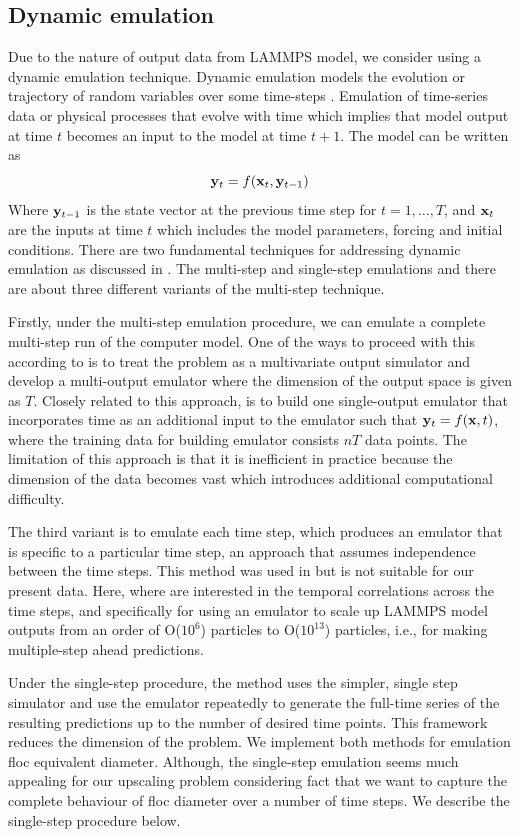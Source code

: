 \subsection{Dynamic emulation}
Due to the nature of output data from LAMMPS model, we consider using a dynamic emulation technique. Dynamic emulation models the evolution or trajectory of random variables over some time-steps \citep{pd12}. Emulation of time-series data or physical processes that evolve with time which implies that model output at time $t$ becomes an input to the model at time $t+1$. The model can be written as 
\begin{equation}\label{dyna3}
{\bf y}_t = f({\bf x}_t, {\bf y}_{t-1})
\end{equation}
Where ${\bf y}_{t-1}$ is the state vector at the previous time step for $t={1,\ldots,T}$, and ${\bf x}_t$ are the inputs at time $t$ which includes the model parameters, forcing and initial conditions. There are two fundamental techniques for addressing dynamic emulation as discussed in \citep{pd12}. The multi-step and single-step emulations and there are about three different variants of the multi-step technique.

Firstly, under the multi-step emulation procedure, we can emulate a complete multi-step run of the computer model. One of the ways to proceed with this according to \citet{pd14} is to treat the problem as a multivariate output simulator and develop a multi-output emulator where the dimension of the output space is given as $T$. Closely related to this approach, is to build one single-output emulator that incorporates time as an additional input to the emulator such that ${\bf y}_t = f({\bf x},t)$, where the training data for building emulator consists $nT$ data points. The limitation of this approach is that it is inefficient in practice because the dimension of the data becomes vast which introduces additional computational difficulty. 

The third variant is to emulate each time step, which produces an emulator that is specific to a particular time step, an approach that assumes independence between the time steps. This method was used in \citet{pd27} but is not suitable for our present data. Here, where are interested in the temporal correlations across the time steps, and specifically for using an emulator to scale up LAMMPS model outputs from an order of O($10^6$) particles to O($10^{13}$) particles, i.e., for making multiple-step ahead predictions. 

Under the single-step procedure, the method uses the simpler, single step simulator and use the emulator repeatedly to generate the full-time series of the resulting predictions up to the number of desired time points. This framework reduces the dimension of the problem. We implement both methods for emulation floc equivalent diameter. Although, the single-step emulation seems much appealing for our upscaling problem considering fact that we want to capture the complete behaviour of floc diameter over a number of time steps.
We describe the single-step procedure below.

